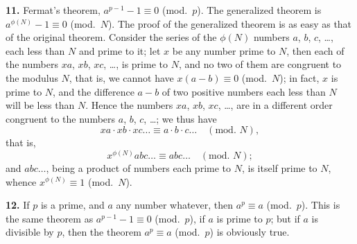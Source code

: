 \documentclass[11pt,a4paper]{book}
\begin{document}
\textbf{11.}\quad
Fermat's theorem, $a^{p-1} - 1 \equiv 0$ (mod.\ $p$). The generalized theorem is $a^{\phi(N)} - 1 \equiv 0$ (mod.\ $N$). The proof of the generalized theorem is as easy as that of the original theorem. Consider the series of the $\phi(N)$ numbers $a$, $b$, $c$, \ldots, each less than $N$ and prime to it; let $x$ be any number prime to $N$, then each of the numbers $xa$, $xb$, $xc$, \ldots, is prime to $N$, and no two of them are congruent to the modulus $N$, that is, we cannot have $x(a - b) \equiv 0$ (mod.\ $N$); in fact, $x$ is prime to $N$, and the difference $a - b$ of two positive numbers each less than $N$ will be less than $N$. Hence the numbers $xa$, $xb$, $xc$, \ldots, are in a different order congruent to the numbers $a$, $b$, $c$, \ldots; we thus have
\[
xa \cdot xb \cdot xc \ldots \equiv a \cdot b \cdot c \ldots \quad (\text{mod.\ } N),
\]
that is,
\[
x^{\phi(N)} abc \ldots \equiv abc \ldots \quad (\text{mod.\ } N);
\]
and $abc \ldots$, being a product of numbers each prime to $N$, is itself prime to $N$, whence $x^{\phi(N)} \equiv 1$ (mod.\ $N$).

\textbf{12.}\quad
If $p$ is a prime, and $a$ any number whatever, then $a^{p} \equiv a$ (mod.\ $p$). This is the same theorem as $a^{p-1} - 1 \equiv 0$ (mod.\ $p$), if $a$ is prime to $p$; but if $a$ is divisible by $p$, then the theorem $a^{p} \equiv a$ (mod.\ $p$) is obviously true.
\end{document}
